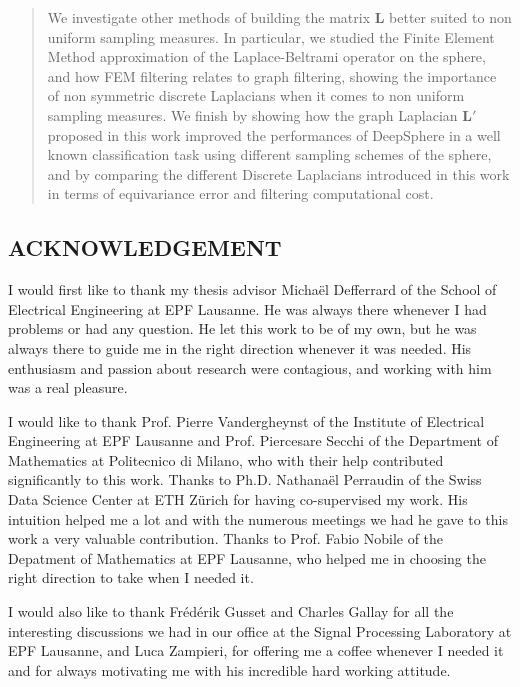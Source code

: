 \documentclass[12pt,titlepage]{article}
\theoremstyle{plain}
\theoremstyle{remark}
\newcommand\blankpage{
\null
\thispagestyle{empty}
\newpage}
\begin{document}
\begin{abstract}
We investigate other methods of building the matrix $\mathbf L$ better suited to non uniform sampling measures. In particular, we studied the Finite Element Method approximation of the Laplace-Beltrami operator on the sphere, and how FEM filtering relates to graph filtering, showing the importance of non symmetric discrete Laplacians when it comes to non uniform sampling measures. We finish by showing how the graph Laplacian $\mathbf L'$ proposed in this work improved the performances of DeepSphere in a well known classification task using different sampling schemes of the sphere, and by comparing the different Discrete Laplacians introduced in this work in terms of equivariance error and filtering computational cost.


\end{abstract}

\afterpage{\blankpage}
\clearpage{}
\begin{center}
	\subsection*{ACKNOWLEDGEMENT}
\end{center}
I would first like to thank my thesis advisor Micha\"el Defferrard of the School of Electrical Engineering at EPF Lausanne. He was always there whenever I had problems or had any question. He let this work to be of my own, but he was always there to guide me in the right direction whenever it was needed. His enthusiasm and passion about research were contagious, and working with him was a real pleasure.

I would like to thank Prof. Pierre Vandergheynst of the Institute of Electrical Engineering at EPF Lausanne and Prof. Piercesare Secchi of the Department of Mathematics at Politecnico di Milano, who with their help contributed significantly to this work. Thanks to Ph.D. Nathana\"el Perraudin of the Swiss Data Science Center at ETH Z\"urich for having co-supervised my work. His intuition helped me a lot and with the numerous meetings we had he gave to this work a very valuable contribution. Thanks to Prof. Fabio Nobile of the Depatment of Mathematics at EPF Lausanne, who helped me in choosing the right direction to take when I needed it.

I would also like to thank Fr\'ed\'erik Gusset and Charles Gallay for all the interesting discussions we had in our office at the Signal Processing Laboratory at EPF Lausanne, and Luca Zampieri, for offering me a coffee whenever I needed it and for always motivating me with his incredible hard working attitude.
\end{document}
